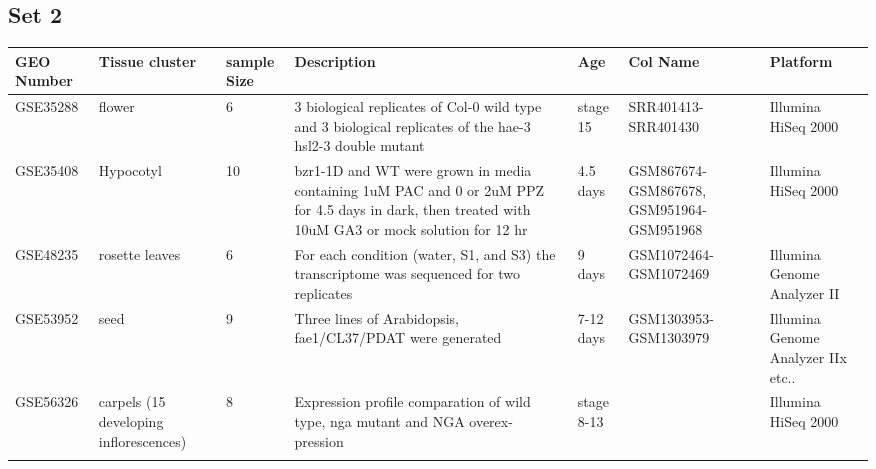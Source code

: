 \documentclass[11pt, a4paper]{article}
\begin{document}
\begin{landscape}
\subsection{Set 2}
\begin{table}
\footnotesize
\centering
\begin{tabular}{p{2cm}p{3cm}p{1cm}p{4cm}p{2.4cm}p{3cm}p{4cm}} \hline
GEO Number &Tissue cluster & sample Size & Description & Age  &Col Name & Platform\\ \hline
 GSE35288 &flower &6  & 3 biological replicates of Col-0 wild type and 3 biological replicates of the hae-3 hsl2-3 double mutant &  stage 15  &SRR401413-SRR401430 &Illumina HiSeq 2000 \\ \hdashline
GSE35408 &Hypocotyl & 10 &bzr1-1D and WT were grown in media containing 1uM PAC and 0 or 2uM PPZ for 4.5 days in dark, then treated with 10uM GA3 or mock solution for 12 hr & 4.5 days  & GSM867674-GSM867678, GSM951964-GSM951968  & Illumina HiSeq 2000 \\ \hdashline
GSE48235 &rosette leaves & 6  & For each condition (water, S1, and S3) the transcriptome was sequenced for two replicates & 9 days & GSM1072464-GSM1072469  &Illumina Genome Analyzer II \\	\hdashline
GSE53952 &seed   & 9 	& Three lines of Arabidopsis, fae1/CL37/PDAT were generated & 7-12 days & GSM1303953-GSM1303979 &Illumina Genome Analyzer IIx etc.. \\  \hdashline
GSE56326 &carpels (15 developing inflorescences) & 8 &Expression profile comparation of wild type, nga mutant and NGA overex- pression &stage 8-13&  & 	Illumina HiSeq 2000 \\ \hdashline
\end{tabular} 
\end{table}
\end{landscape}
\end{document}
